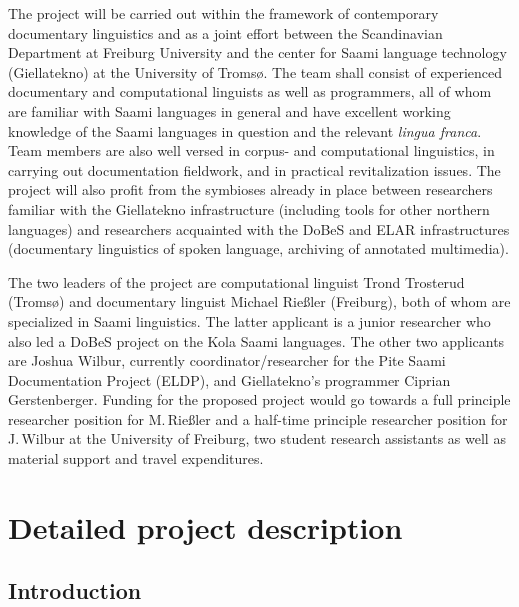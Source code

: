 \documentclass[a4paper,12pt]{article}
\begin{document}
The project will be carried out within the framework of contemporary documentary linguistics and as a joint effort between the Scandinavian Department at Freiburg University and the center for Saami language technology (Giellatekno) at the University of Tromsø.
The team shall consist of experienced documentary and computational linguists as well as programmers, all of whom are familiar with Saami languages in general and have excellent working knowledge of the Saami languages in question and the relevant \textit{lingua franca}. Team members are also well versed in corpus- and computational linguistics, in carrying out documentation fieldwork, and in practical revitalization issues. The project will also profit from the symbioses already in place between researchers familiar with the Giellatekno infrastructure (including tools for other northern languages) and researchers acquainted with the DoBeS and ELAR infrastructures (documentary linguistics of spoken language, archiving of annotated multimedia).

The two leaders of the project are computational linguist Trond Trosterud (Tromsø) and documentary linguist Michael Rießler (Freiburg), both of whom are specialized in Saami linguistics. The latter applicant is a junior researcher who also led a DoBeS project on the Kola Saami languages. The other two applicants are Joshua Wilbur, currently coordinator/researcher for the Pite Saami Documentation Project (ELDP), and Giellatekno's programmer Ciprian Gerstenberger. Funding for the proposed project would go towards a full principle researcher position for M.\,Rießler and a half-time principle researcher position for J.\,Wilbur at the University of Freiburg, two student research assistants as well as material support and travel expenditures. 

\section{Detailed project description}%
\subsection{Introduction}%
\end{document}
